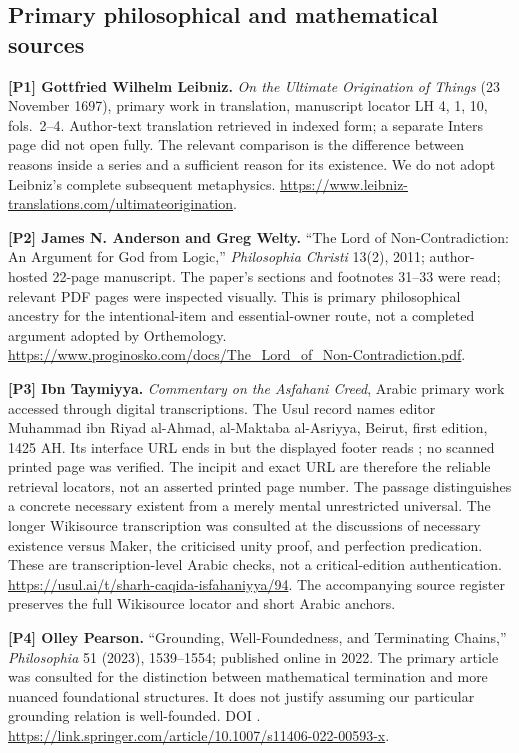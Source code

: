 \documentclass[11pt,a4paper]{article}
\begin{document}
\subsection*{Primary philosophical and mathematical
sources}\label{primary-philosophical-and-mathematical-sources}

\textbf{{[}P1{]} Gottfried Wilhelm Leibniz.} \emph{On the Ultimate
Origination of Things} (23 November 1697), primary work in translation,
manuscript locator LH 4, 1, 10, fols.~2--4. Author-text translation
retrieved in indexed form; a separate Inters page did not open fully.
The relevant comparison is the difference between reasons inside a
series and a sufficient reason for its existence. We do not adopt
Leibniz's complete subsequent metaphysics.
\url{https://www.leibniz-translations.com/ultimateorigination}.

\textbf{{[}P2{]} James N. Anderson and Greg Welty.} ``The Lord of
Non-Contradiction: An Argument for God from Logic,'' \emph{Philosophia
Christi} 13(2), 2011; author-hosted 22-page manuscript. The paper's
sections and footnotes 31--33 were read; relevant PDF pages were
inspected visually. This is primary philosophical ancestry for the
intentional-item and essential-owner route, not a completed argument
adopted by Orthemology.
\url{https://www.proginosko.com/docs/The_Lord_of_Non-Contradiction.pdf}.

\textbf{{[}P3{]} Ibn Taymiyya.} \emph{Commentary on the Asfahani Creed},
Arabic primary work accessed through digital transcriptions. The Usul
record names editor Muhammad ibn Riyad al-Ahmad, al-Maktaba al-Asriyya,
Beirut, first edition, 1425 AH. Its interface URL ends in  but
the displayed footer reads ; no scanned printed page was
verified. The incipit and exact URL are therefore the reliable retrieval
locators, not an asserted printed page number. The passage distinguishes
a concrete necessary existent from a merely mental unrestricted
universal. The longer Wikisource transcription was consulted at the
discussions of necessary existence versus Maker, the criticised unity
proof, and perfection predication. These are transcription-level Arabic
checks, not a critical-edition authentication.
\url{https://usul.ai/t/sharh-caqida-isfahaniyya/94}. The accompanying
source register preserves the full Wikisource locator and short Arabic
anchors.

\textbf{{[}P4{]} Olley Pearson.} ``Grounding, Well-Foundedness, and
Terminating Chains,'' \emph{Philosophia} 51 (2023), 1539--1554;
published online in 2022. The primary article was consulted for the
distinction between mathematical termination and more nuanced
foundational structures. It does not justify assuming our particular
grounding relation is well-founded. DOI
.
\url{https://link.springer.com/article/10.1007/s11406-022-00593-x}.
\end{document}
